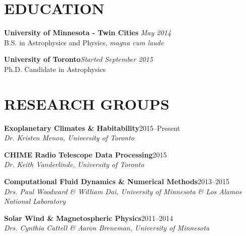 \documentclass[10pt]{res} %
\begin{document}
\begin{resume}

 
\section{EDUCATION}  

\textbf{University of Minnesota - Twin Cities} \hfill {\sl May 2014}\\
B.S. in Astrophysics and Physics, {\sl magna cum laude}

\textbf{University of Toronto}\hfill{\sl Started September 2015}\\
Ph.D. Candidate in Astrophysics



\section{RESEARCH GROUPS}

\textbf{Exoplanetary Climates \& Habitability}\hfill 2015--Present\\
\sl{Dr. Kristen Menou, University of Toronto}

\textbf{CHIME Radio Telescope Data Processing}\hfill 2015\\
\sl{Dr. Keith Vanderlinde, University of Toronto}

\textbf{Computational Fluid Dynamics \& Numerical Methods}\hfill 2013--2015\\
\sl{Drs. Paul Woodward \& William Dai, University of Minnesota \& Los Alamos National Laboratory}

\textbf{Solar Wind \& Magnetospheric Physics}\hfill 2011--2014\\
\sl{Drs. Cynthia Cattell \& Aaron Breneman, University of Minnesota}


\end{resume}
\end{document}
